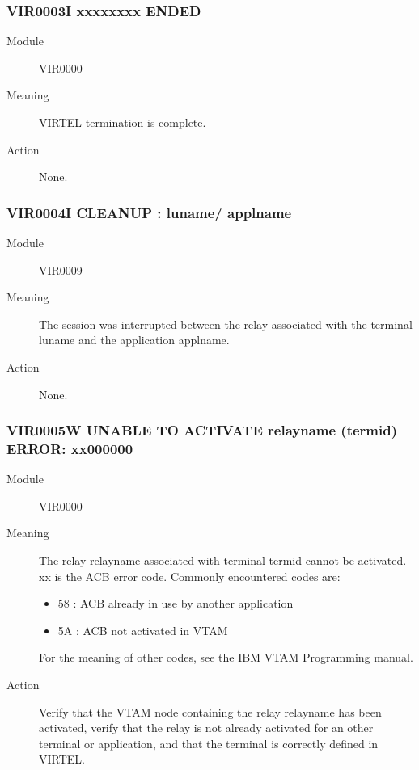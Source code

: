 \documentclass[letterpaper,10pt,english]{sphinxmanual}
\begin{document}
\subsubsection{VIR0003I xxxxxxxx ENDED}
\label{\detokenize{messages:vir0003i-xxxxxxxx-ended}}\begin{description}
\item[{Module}] \leavevmode
VIR0000

\item[{Meaning}] \leavevmode
VIRTEL termination is complete.

\item[{Action}] \leavevmode
None.

\end{description}


\subsubsection{VIR0004I CLEANUP : luname/ applname}
\label{\detokenize{messages:vir0004i-cleanup-luname-applname}}\begin{description}
\item[{Module}] \leavevmode
VIR0009

\item[{Meaning}] \leavevmode
The session was interrupted between the relay associated with the terminal luname and the application applname.

\item[{Action}] \leavevmode
None.

\end{description}


\subsubsection{VIR0005W UNABLE TO ACTIVATE relayname (termid) ERROR: xx000000}
\label{\detokenize{messages:vir0005w-unable-to-activate-relayname-termid-error-xx000000}}\begin{description}
\item[{Module}] \leavevmode
VIR0000

\item[{Meaning}] \leavevmode
The relay relayname associated with terminal termid cannot be activated. xx is the ACB error code. Commonly encountered codes are:
\begin{itemize}
\item {} 
58 : ACB already in use by another application

\item {} 
5A : ACB not activated in VTAM

\end{itemize}

For the meaning of other codes, see the IBM VTAM Programming manual.

\item[{Action}] \leavevmode
Verify that the VTAM node containing the relay relayname has been activated, verify that the relay is not already activated for an other terminal or application, and that the terminal is correctly defined in VIRTEL.

\end{description}
\end{document}
